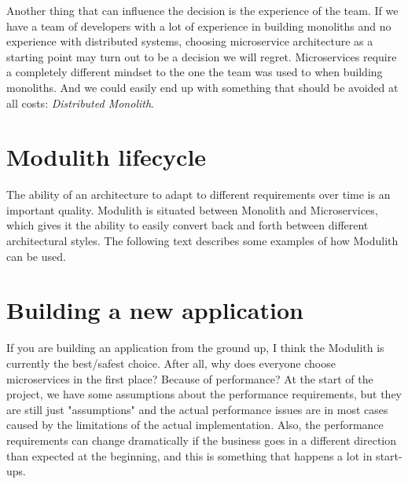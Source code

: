 Another thing that can influence the decision is the experience of the team. If we have a team of developers with a lot of experience in building monoliths and no experience with distributed systems, choosing microservice architecture as a starting point may turn out to be a decision we will regret. Microservices require a completely different mindset to the one the team was used to when building monoliths. And we could easily end up with something that should be avoided at all costs: \textit{Distributed Monolith}.

\section{Modulith lifecycle}
The ability of an architecture to adapt to different requirements over time is an important quality. Modulith is situated between Monolith and Microservices, which gives it the ability to easily convert back and forth between different architectural styles. The following text describes some examples of how Modulith can be used.

\section{Building a new application}
If you are building an application from the ground up, I think the Modulith is currently the best/safest choice. After all, why does everyone choose microservices in the first place? Because of performance? At the start of the project, we have some assumptions about the performance requirements, but they are still just "assumptions" and the actual performance issues are in most cases caused by the limitations of the actual implementation. Also, the performance requirements can change dramatically if the business goes in a different direction than expected at the beginning, and this is something that happens a lot in start-ups.

